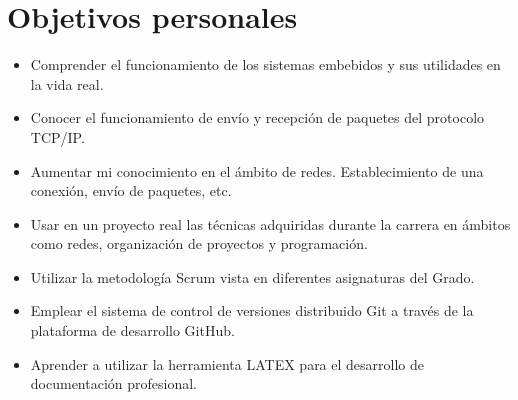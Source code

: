\section{Objetivos personales}\label{sec:OPersonales}
\begin{itemize}
	\item Comprender el funcionamiento de los sistemas embebidos y sus utilidades en la vida real.
	\item Conocer el funcionamiento de envío y recepción de paquetes del protocolo TCP/IP.
	\item Aumentar mi conocimiento en el ámbito de redes. Establecimiento de una conexión, envío de paquetes, etc.
	\item Usar en un proyecto real las técnicas adquiridas durante la carrera en ámbitos como redes, organización de proyectos y programación.
	\item Utilizar la metodología Scrum vista en diferentes asignaturas del Grado.
	\item Emplear el sistema de control de versiones distribuido Git a través de la plataforma de desarrollo GitHub.
	\item Aprender a utilizar la herramienta LATEX para el desarrollo de documentación profesional.
\end{itemize}		

		